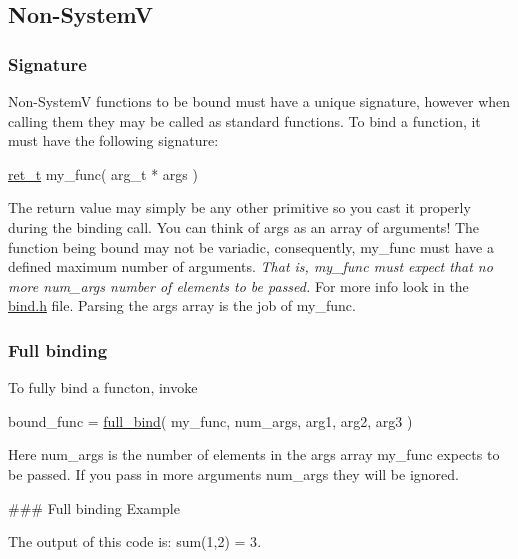 \subsection*{Non-\/\+SystemV}

\subsubsection*{Signature}

Non-\/\+SystemV functions to be bound must have a unique signature, however when calling them they may be called as standard functions. To bind a function, it must have the following signature\+: 
\begin{DoxyCode}
\hyperlink{bind_8h_a54aeeb54a7a6a62c72ec8dc7718fdd91}{ret\_t} my\_func( arg\_t * args )
\end{DoxyCode}
 The return value may simply be any other primitive so you cast it properly during the binding call. You can think of {\ttfamily args} as an array of arguments! The function being bound may not be variadic, consequently, {\ttfamily my\+\_\+func} must have a defined maximum number of \textquotesingle{}arguments\textquotesingle{}. {\itshape That is, {\ttfamily my\+\_\+func} must expect that no more {\ttfamily num\+\_\+args} number of elements to be passed.} For more info look in the {\ttfamily \hyperlink{bind_8h}{bind.\+h}} file. Parsing the {\ttfamily args} array is the job of {\ttfamily my\+\_\+func}.

\subsubsection*{Full binding}

To fully bind a functon, invoke 
\begin{DoxyCode}
bound\_func = \hyperlink{bind_8c_a31fdc3dfcbd70d3f32f4e3c8a2084c6a}{full\_bind}( my\_func, num\_args, arg1, arg2, arg3 )
\end{DoxyCode}
 Here {\ttfamily num\+\_\+args} is the number of elements in the {\ttfamily args} array {\ttfamily my\+\_\+func} expects to be passed. If you pass in more arguments {\ttfamily num\+\_\+args} they will be ignored.

\#\#\# Full binding Example 
 The output of this code is\+: {\ttfamily sum(1,2) = 3}.

